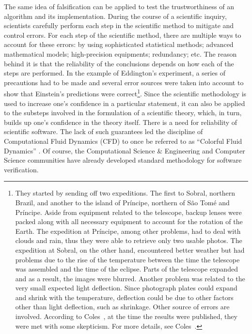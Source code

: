 The same idea of falsification can be applied to test the trustworthiness of an algorithm and its implementation. During the course of a  scientific inquiry, scientists carefully perform each step in the scientific method to mitigate and control errors. For each step of the scientific method, there are multiple ways to account for these errors: by using sophisticated statistical methods; advanced mathematical models; high-precision equipments; redundancy; etc.  The reason behind it is that the reliability of the conclusions depends on how each of the steps are performed. In the example of Eddington's experiment, a series of precautions had to be made and several error sources were taken into account to show that Einstein's predictions were correct\footnote{They started by sending off two expeditions. The first to Sobral, northern Brazil, and another to the island of Pr\'incipe, northern of S\~ao Tom\'e and Pr\'incipe. Aside from equipment related to the telescope, backup lenses were packed along with all necessary equipment to account for the rotation of the Earth. The expedition at Pr\'incipe, among other problems, had to deal with clouds and rain, thus they were able to retrieve only two usable photos. The expedition at Sobral, on the other hand, encountered better weather but had problems due to the rise of the temperature between the time the telescope was assembled and the time of the eclipse. Parts of the telescope expanded and as a result, the images were blurred. Another problem was related to the very small expected light deflection. Since photograph plates could expand and shrink with the temperature, deflection could be due to other factors other than light deflection, such as shrinkage. Other source of errors are involved. According to Coles~\cite{coles2001einstein}, at the time the results were published, they were met with some skepticism. For more details, see Coles~\cite{coles2001einstein}.}. 
%
Since the scientific methodology is used to increase one's confidence in a particular statement, it can also be applied to the substeps involved in the formulation of a scientific theory, which, in turn, builds up one's confidence in the theory itself. 
There is a need for reliability of scientific software. The lack of such guarantees led the discipline of Computational Fluid Dynamics (CFD) to once be  referred to as ``Colorful Fluid Dynamics'' \cite{meroney2004wind}. Of course, the Computational Science \& Engineering and Computer Science communities have already developed standard methodology for software verification.

